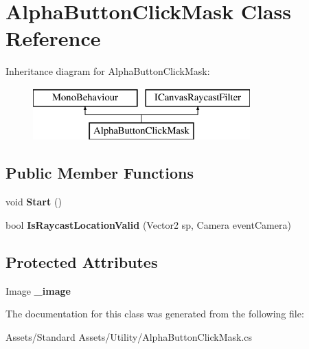 \hypertarget{class_alpha_button_click_mask}{}\section{Alpha\+Button\+Click\+Mask Class Reference}
\label{class_alpha_button_click_mask}
Inheritance diagram for Alpha\+Button\+Click\+Mask\+:\begin{figure}[H]
\begin{center}
\leavevmode
\includegraphics[height=2.000000cm]{class_alpha_button_click_mask}
\end{center}
\end{figure}
\subsection*{Public Member Functions}
\begin{DoxyCompactItemize}
\item 
void {\bfseries Start} ()\hypertarget{class_alpha_button_click_mask_ad514a69b8627767212f3f71bd247dad4}{}\label{class_alpha_button_click_mask_ad514a69b8627767212f3f71bd247dad4}

\item 
bool {\bfseries Is\+Raycast\+Location\+Valid} (Vector2 sp, Camera event\+Camera)\hypertarget{class_alpha_button_click_mask_a4eeb27cc5c817d232326e141ba301ae7}{}\label{class_alpha_button_click_mask_a4eeb27cc5c817d232326e141ba301ae7}

\end{DoxyCompactItemize}
\subsection*{Protected Attributes}
\begin{DoxyCompactItemize}
\item 
Image {\bfseries \+\_\+image}\hypertarget{class_alpha_button_click_mask_a7664c7c76f1b1f74341a0d1a1174c873}{}\label{class_alpha_button_click_mask_a7664c7c76f1b1f74341a0d1a1174c873}

\end{DoxyCompactItemize}


The documentation for this class was generated from the following file\+:\begin{DoxyCompactItemize}
\item 
Assets/\+Standard Assets/\+Utility/Alpha\+Button\+Click\+Mask.\+cs\end{DoxyCompactItemize}
